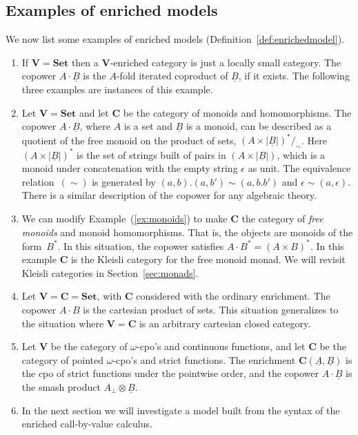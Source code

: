 \documentclass{LMCS}
\newcommand{\VCat}{\fixedcatfont{V}} \newcommand{\CCat}{\fixedcatfont{C}} \newcommand{\DCat}{\fixedcatfont{D}}
\newcommand{\ltensor}[2]{#1 \cdot #2}
\newcommand{\fixedcatfont}{\mathbf}
\newcommand{\algA}{\underline{A}}
\newcommand{\algB}{\underline{B}}
\newcommand{\Set}{\mathbf{Set}}
\begin{document}
\subsection{Examples of enriched models}
\label{sec:examplesenriched}
We now list some examples of enriched models (Definition~\ref{def:enrichedmodel}).
\begin{enumerate}
\item If $\VCat=\Set$ then a $\VCat$-enriched category 
is just a locally small category.
The copower $\ltensor A \algB$ is the $A$-fold 
iterated coproduct of $\algB$, if it exists.
The following three examples are instances of this example.
\item \label{ex:monoids}Let $\VCat=\Set$ and let $\CCat$ be 
the category of monoids and homomorphisms.
The copower $\ltensor A\algB$, where $A$ is a set and $\algB$ is a monoid,
can be described as a quotient of the free monoid on the product of sets,
$(A\times |\algB|)^*/_\sim$.
Here $(A\times |\algB|)^*$ is the 
set of strings built of pairs in $(A\times |\algB|)$,
which is a monoid under concatenation
with the empty string $\epsilon$ as unit.
The equivalence relation~$(\sim)$ is generated by
$(a,b).(a,b')\sim (a,b.b')$ and $\epsilon \sim (a,\epsilon)$.
There is a similar description of the copower for any algebraic theory.
\item
We can modify Example~(\ref{ex:monoids}) 
to make $\CCat$ the category of 
\emph{free monoids} and monoid homomorphisms.
That is, the objects are monoids of the form~$B^*$.
In this situation, the copower satisfies 
$\ltensor A{B^*}=(A\times B)^*$.
In this example $\CCat$ is the Kleisli category 
for the free monoid monad. We will revisit Kleisli categories in 
Section~\ref{sec:monads}.
\item Let $\VCat=\CCat=\Set$,
with $\CCat$ considered with the ordinary enrichment.
The copower $\ltensor A B$ is the cartesian product of sets.
This situation generalizes to the situation where $\VCat=\CCat$ is an arbitrary
cartesian closed category.
\item Let $\VCat$ be the category of $\omega$-cpo's and continuous functions, 
and let $\CCat$ be the category of pointed $\omega$-cpo's and strict functions.
The enrichment $\CCat(\algA,\algB)$ is the cpo of strict functions under
the pointwise order, and the copower $\ltensor A\algB$ is the smash product
$A_\bot\otimes \algB$.
\item In the next section we will investigate a model
built from the syntax of the enriched 
call-by-value calculus.
\end{enumerate}
\end{document}
